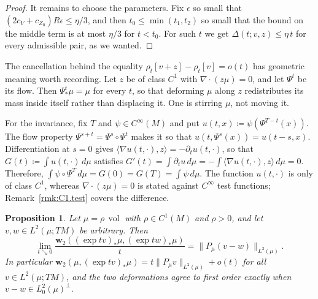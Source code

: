 \documentclass[11pt,reqno]{amsart}
\theoremstyle{plain}
\newtheorem{prp}[thm]{Proposition}
\theoremstyle{definition}
\newcommand{\dw}{\mathbf{w}_2}
\DeclareMathOperator{\vol}{vol}
\begin{document}
\begin{proof}
    It remains to choose the parameters.
    Fix \( \epsilon \) so small that \( (2c_V+c_{Z_0})R\epsilon\le\eta/3 \), and then \( t_0\le\min(t_1,t_2) \) so small that the bound on the middle term is at most \( \eta/3 \) for \( t<t_0 \).
    For such \( t \) we get \( \Delta(t;v,z)\le\eta\,t \) for every admissible pair, as we wanted.
\end{proof}

The cancellation behind the equality \( \rho_t[v+z]-\rho_t[v]=o(t) \) has geometric meaning worth recording.
Let \( z \) be of class \( C^1 \) with \( \nabla\!\cdot(z\mu)=0 \), and let \(\Psi^t\) be its flow.
Then \( \Psi^t_\ast\mu=\mu \) for every \( t \), so that deforming \( \mu \) along \( z \) redistributes its mass inside itself rather than displacing it.
One is stirring \( \mu \), not moving it.

For the invariance, fix \( T \) and \( \psi\in C^\infty(M) \) and put \( u(t,x)\coloneqq\psi( \Psi^{T-t}(x)) \).
The flow property \(\Psi^{s+t}=\Psi^s\circ\Psi^t\) makes it so that \(u(t,\Psi^s(x))=u(t-s,x)\).
Differentiation at \(s=0\) gives \(\langle\nabla u(t,\cdot),z\rangle=-\partial_tu(t,\cdot) \), so that \( G(t)\coloneqq\int u(t,\cdot)\,d\mu \) satisfies \( G'(t)=\int\partial_tu\,d\mu=-\int\langle\nabla u(t,\cdot),z\rangle\,d\mu=0 \).
Therefore, \( \int\psi\circ\Psi^T\,d\mu=G(0)=G(T)=\int\psi\,d\mu \).
The function \(u(t,\cdot)\) is only of class \(C^1\), whereas \(\nabla\!\cdot(z\mu)=0\) is stated against \(C^\infty\) test functions; Remark~\ref{rmk:C1.test} covers the difference.


\begin{prp}
\label{prp:solenoidal.dual}
    Let \( \mu=\rho\,\vol \) with \( \rho\in C^1(M) \) and \( \rho>0 \), and let \( v,w\in L^2(\mu;TM) \) be arbitrary.
    Then
    \[
        \lim_{t\searrow0}\frac{\dw\left((\exp tv)_\ast\mu,(\exp tw)_\ast\mu\right)}{t}=\big\lVert P_\mu(v-w)\big\rVert_{L^2(\mu)} .
    \]
    In particular \( \dw\left(\mu,(\exp tv)_\ast\mu\right)=t\lVert P_\mu v\rVert_{L^2(\mu)}+o(t) \) for all \( v\in L^2(\mu;TM) \), and the two deformations agree to first order exactly when \( v-w\in L^2_0(\mu)^\perp \).
\end{prp}
\end{document}
